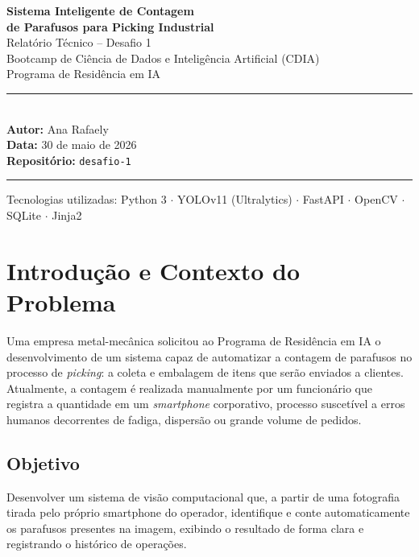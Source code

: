 \documentclass[12pt,a4paper]{article}
\begin{document}
\begin{titlepage}
  \centering
  \vspace*{2cm}
  {\huge\bfseries\color{primary}
    Sistema Inteligente de Contagem\\[0.4em]
    de Parafusos para Picking Industrial\\[1.2em]}
  {\large\color{darkgray}
    Relat\'orio T\'ecnico -- Desafio 1\\
    Bootcamp de Ci\^encia de Dados e Intelig\^encia Artificial (CDIA)\\
    Programa de Resid\^encia em IA\\[2cm]}
  \rule{\linewidth}{0.5pt}\\[0.4em]
  {\normalsize
    \textbf{Autor:} Ana Rafaely\\[0.3em]
    \textbf{Data:} 30 de maio de 2026\\[0.3em]
    \textbf{Reposit\'orio:} \texttt{desafio-1}\\
  }
  \rule{\linewidth}{0.5pt}
  \vfill
  {\small\color{gray}
    Tecnologias utilizadas: Python 3 $\cdot$ YOLOv11 (Ultralytics) $\cdot$ FastAPI $\cdot$
    OpenCV $\cdot$ SQLite $\cdot$ Jinja2
  }
\end{titlepage}

\tableofcontents
\newpage

\section{Introdu\c{c}\~ao e Contexto do Problema}

Uma empresa metal-mec\^anica solicitou ao Programa de Resid\^encia em IA o desenvolvimento de
um sistema capaz de automatizar a contagem de parafusos no processo de \emph{picking}: a
coleta e embalagem de itens que ser\~ao enviados a clientes. Atualmente, a contagem \'e
realizada manualmente por um funcion\'ario que registra a quantidade em um \emph{smartphone}
corporativo, processo suscet\'ivel a erros humanos decorrentes de fadiga, dispers\~ao ou
grande volume de pedidos.

\subsection{Objetivo}

Desenvolver um sistema de vis\~ao computacional que, a partir de uma fotografia tirada pelo
pr\'oprio smartphone do operador, identifique e conte automaticamente os parafusos presentes
na imagem, exibindo o resultado de forma clara e registrando o hist\'orico de opera\c{c}\~oes.
\end{document}
